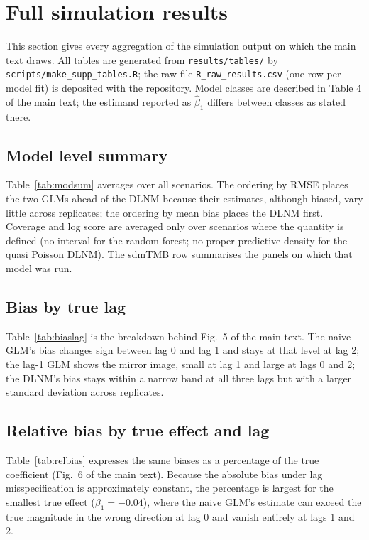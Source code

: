 \documentclass[11pt,a4paper]{article}
\begin{document}
\dgpCalibrationTable

\section{Full simulation results}
This section gives every aggregation of the simulation output on which the main text draws. All tables are generated from \texttt{results/tables/} by \texttt{scripts/make\_supp\_tables.R}; the raw file \texttt{R\_raw\_results.csv} (one row per model fit) is deposited with the repository. Model classes are described in Table 4 of the main text; the estimand reported as $\hat\beta_1$ differs between classes as stated there.

\subsection{Model level summary}
Table~\ref{tab:modsum} averages over all \nScenarios{} scenarios. The ordering by RMSE places the two GLMs ahead of the DLNM because their estimates, although biased, vary little across replicates; the ordering by mean bias places the DLNM first. Coverage and log score are averaged only over scenarios where the quantity is defined (no interval for the random forest; no proper predictive density for the quasi Poisson DLNM). The sdmTMB row summarises the \sdmtmbPanelsN{} panels on which that model was run.
\modelSummaryTable

\subsection{Bias by true lag}
Table~\ref{tab:biaslag} is the breakdown behind Fig.~5 of the main text. The naive GLM's bias changes sign between lag 0 and lag 1 and stays at that level at lag 2; the lag-1 GLM shows the mirror image, small at lag 1 and large at lags 0 and 2; the DLNM's bias stays within a narrow band at all three lags but with a larger standard deviation across replicates.
\biasByLagTable

\subsection{Relative bias by true effect and lag}
Table~\ref{tab:relbias} expresses the same biases as a percentage of the true coefficient (Fig.~6 of the main text). Because the absolute bias under lag misspecification is approximately constant, the percentage is largest for the smallest true effect ($\beta_1 = -0.04$), where the naive GLM's estimate can exceed the true magnitude in the wrong direction at lag 0 and vanish entirely at lags 1 and 2.
\relativeBiasTable
\end{document}
